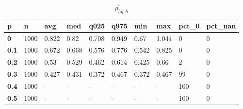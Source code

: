 \begin{table}[h]
 \centering 
\footnotesize
\caption{$\rho_{hg,h}^\prime $}
\label{tab:alphahgh}
\begin{tabular}[h]{|l|l|l|l|l|l|l|l|l|l|
    } \hline
\textbf{ p} & \textbf{ n} & \textbf{ avg} & \textbf{ med} & \textbf{ q025} & \textbf{ q975} & \textbf{ min} & \textbf{ max} & \textbf{ pct\_0} & \textbf{ pct\_nan}
    \\ \hline
  \textbf{  0} & 1000 & 0.822 &  0.82 & 0.708 & 0.949 &  0.67 & 1.044 &   0 & 0
    \\ \hline
  \textbf{0.1} & 1000 & 0.672 & 0.668 & 0.576 & 0.776 & 0.542 & 0.825 &   0 & 0
    \\ \hline
  \textbf{0.2} & 1000 &  0.53 & 0.529 & 0.462 & 0.614 & 0.425 &  0.66 &   2 & 0
    \\ \hline
  \textbf{0.3} & 1000 & 0.427 & 0.431 & 0.372 & 0.467 & 0.372 & 0.467 &  99 & 0
    \\ \hline
  \textbf{0.4} & 1000 & - & - & - & - & - & - & 100 & 0
    \\ \hline
  \textbf{0.5} & 1000 & - & - & - & - & - & - & 100 & 0
    \\ \hline
 \end{tabular}
 \end{table}

